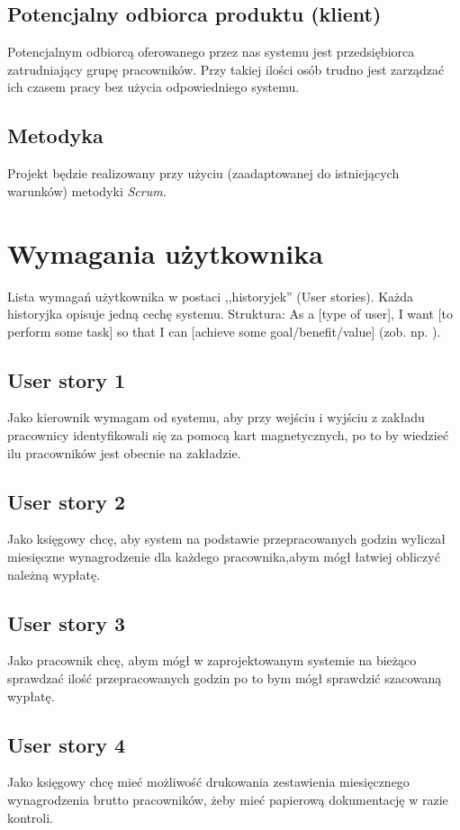 \documentclass[a4paper]{article}
\begin{document}
\subsection{Potencjalny odbiorca produktu (klient)}

Potencjalnym odbiorcą oferowanego przez nas systemu jest przedsiębiorca zatrudniający grupę pracowników. Przy takiej ilości osób trudno jest zarządzać ich czasem pracy bez użycia odpowiedniego systemu.  

\subsection{Metodyka}

Projekt będzie realizowany przy użyciu (zaadaptowanej do istniejących warunków) metodyki {\em Scrum}. 

\section{Wymagania użytkownika}
Lista wymagań użytkownika w postaci ,,historyjek'' (User stories). Każda historyjka opisuje jedną cechę systemu. Struktura: As a [type of user], I want [to perform some task] so that I can [achieve some goal/benefit/value] (zob. np. \cite{us}).

\subsection{User story 1}
Jako kierownik wymagam od systemu, aby przy wejściu i wyjściu z zakładu pracownicy identyfikowali się za pomocą kart magnetycznych, po to by wiedzieć ilu pracowników jest obecnie na zakładzie.

\subsection{User story 2}
Jako księgowy chcę, aby system na podstawie przepracowanych godzin wyliczał miesięczne wynagrodzenie dla każdego pracownika,abym mógł łatwiej obliczyć należną wypłatę.

\subsection{User story 3}
Jako pracownik chcę, abym mógł w zaprojektowanym systemie na bieżąco sprawdzać ilość przepracowanych godzin po to bym mógł sprawdzić szacowaną wypłatę.

\subsection{User story 4}
Jako księgowy chcę mieć możliwość drukowania zestawienia miesięcznego wynagrodzenia brutto pracowników, żeby mieć papierową dokumentację w razie kontroli.
\end{document}
